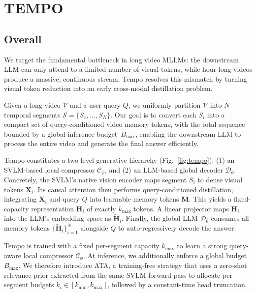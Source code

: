 \section{TEMPO}
\label{sec:method}

\subsection{Overall}
\label{sec:method:overview}


We target the fundamental bottleneck in long video MLLMs: the downstream LLM can only attend to a limited number of visual tokens, while hour-long videos produce a massive, continuous stream. Tempo resolves this mismatch by turning visual token reduction into an early cross-modal distillation problem.

Given a long video $\mathcal{V}$ and a user query $Q$, we uniformly partition $\mathcal{V}$ into $N$ temporal segments $\mathcal{S}=\{S_1,\dots,S_N\}$. Our goal is to convert each $S_i$ into a compact set of query-conditioned video memory tokens, with the total sequence bounded by a global inference budget~$B_{\max}$, enabling the downstream LLM to process the entire video and generate the final answer efficiently.

Tempo constitutes a two-level generative hierarchy (Fig.~\ref{fig:tempo}):
%
(1) an SVLM-based local compressor $\mathcal{C}_\phi$, and (2) an LLM-based global decoder $\mathcal{D}_\theta$.
%
Concretely, the SVLM's native vision encoder maps segment $S_i$ to dense visual tokens $\mathbf{X}_i$. Its causal attention then performs query-conditioned distillation, integrating $\mathbf{X}_i$ and query $Q$ into learnable memory tokens $\mathbf{M}$.
%
This yields a fixed-capacity representation $\mathbf{H}_i$ of exactly $k_{\max}$ tokens. A linear projector maps $\mathbf{H}_i$ into the LLM's embedding space as $\tilde{\mathbf{H}}_i$. Finally, the global LLM $\mathcal{D}_\theta$ consumes all memory tokens $\{\tilde{\mathbf{H}}_i\}_{i=1}^N$ alongside $Q$ to auto-regressively decode the answer.


Tempo is trained with a fixed per-segment capacity $k_{\max}$ to learn a strong query-aware local compressor $\mathcal{C}_\phi$. At inference, we additionally enforce a global budget $B_{\max}$. We therefore introduce ATA, a training-free strategy that uses a zero-shot relevance prior extracted from the same SVLM forward pass to allocate per-segment budgets $k_i \in [k_{\min}, k_{\max}]$, followed by a constant-time head truncation.

